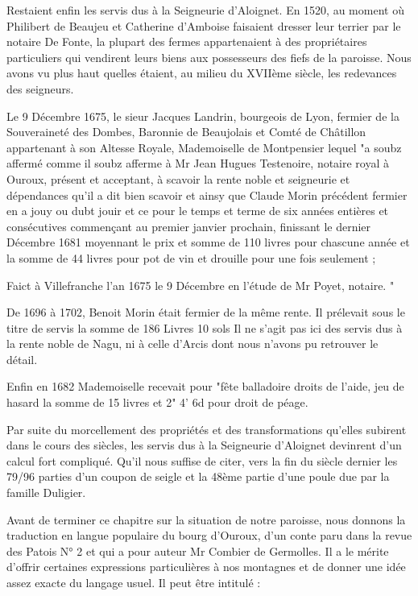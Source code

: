 Restaient enfin les servis dus à la Seigneurie d'Aloignet. En 1520, au moment où Philibert de Beaujeu et Catherine d'Amboise faisaient dresser leur terrier par le notaire De Fonte, la plupart des fermes appartenaient à des propriétaires particuliers qui vendirent leurs biens aux possesseurs des fiefs de la paroisse. Nous avons vu plus haut quelles étaient, au milieu du XVIIème siècle, les redevances des seigneurs.

Le 9 Décembre 1675, le sieur Jacques Landrin, bourgeois de Lyon, fermier de la Souveraineté des Dombes, Baronnie de Beaujolais et Comté de Châtillon appartenant à son Altesse Royale, Mademoiselle de Montpensier lequel "a soubz affermé comme il soubz afferme à Mr Jean Hugues Testenoire, notaire royal à Ouroux, présent et acceptant, à scavoir la rente noble et seigneurie et dépendances qu'il a dit bien scavoir et ainsy que Claude Morin précédent fermier en a jouy ou dubt jouir et ce pour le temps et terme de six années entières et consécutives commençant au premier janvier prochain, finissant le dernier Décembre 1681 moyennant le prix et somme de 110 livres pour chascune année et la somme de 44 livres pour pot de vin et drouille pour une fois seulement ;

Faict à Villefranche l'an 1675 le 9 Décembre en l'étude de Mr Poyet, notaire. "

De 1696 à 1702, Benoit Morin était fermier de la même rente.
Il prélevait sous le titre de servis la somme de 186 Livres 10 sols
Il ne s'agit pas ici des servis dus à la rente noble de Nagu, ni à celle d'Arcis dont nous n'avons pu retrouver le détail.

Enfin en 1682 Mademoiselle recevait pour "fête balladoire droits de l'aide, jeu de hasard la somme de 15 livres et 2" 4' 6d pour droit de péage.

Par suite du morcellement des propriétés et des transformations qu'elles subirent dans le cours des siècles, les servis dus à la Seigneurie d'Aloignet devinrent d'un calcul fort compliqué. Qu'il nous suffise de citer, vers la fin du siècle dernier les 79/96 parties d'un coupon de seigle et la 48ème partie d'une poule due par la famille Duligier.

Avant de terminer ce chapitre sur la situation de notre paroisse, nous donnons la traduction en langue populaire du bourg d'Ouroux, d'un conte paru dans la revue des Patois N° 2 et qui a pour auteur Mr Combier de Germolles. Il a le mérite d'offrir certaines expressions particulières à nos montagnes et de donner une idée assez exacte du langage usuel. Il peut être intitulé :


